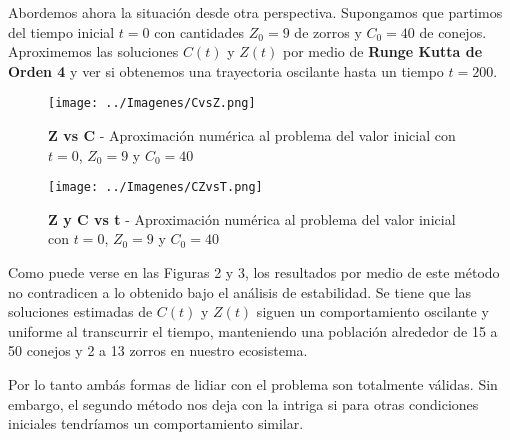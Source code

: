 \documentclass[10pt,journal,compsoc]{IEEEtran}
\begin{document}
 Abordemos ahora la situación desde otra perspectiva. Supongamos que partimos
 del tiempo inicial $t = 0$ con cantidades $Z_0 = 9$ de zorros y $C_0 = 40$ de
 conejos. Aproximemos las soluciones $C(t)$ y $Z(t)$ por medio de \textbf{Runge
 Kutta de Orden 4} y ver si obtenemos una trayectoria oscilante hasta un tiempo
 $t = 200$.

 \begin{figure}[!t]
  \centering
  \texttt{[image: ../Imagenes/CvsZ.png]}
  \caption{\textbf{Z vs C} - Aproximación numérica al problema del valor inicial
  con $t = 0$, $Z_0 = 9$ y $C_0 = 40$}
  \label{fig_sim}
 \end{figure}

 \begin{figure}[!t]
  \centering
  \texttt{[image: ../Imagenes/CZvsT.png]}
  \caption{\textbf{Z y C vs t} - Aproximación numérica al problema del valor
  inicial con $t = 0$, $Z_0 = 9$ y $C_0 = 40$}
  \label{fig_sim}
 \end{figure}

 Como puede verse en las Figuras 2 y 3, los resultados por medio de este método
 no contradicen a lo obtenido bajo el análisis de estabilidad. Se tiene que las
 soluciones estimadas de $C(t)$ y $Z(t)$ siguen un comportamiento oscilante y
 uniforme al transcurrir el tiempo, manteniendo una población alrededor de 15 a
 50 conejos y 2 a 13 zorros en nuestro ecosistema.

 Por lo tanto ambás formas de lidiar con el problema son totalmente válidas. Sin
 embargo, el segundo método nos deja con la intriga si para otras condiciones
 iniciales tendríamos un comportamiento similar.
%
%
\end{document}
